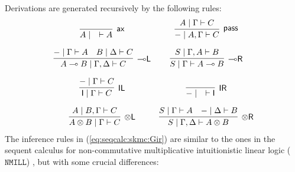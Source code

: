 \documentclass[sn-mathphys-num]{sn-jnl}%
\newcommand{\vd}{\vdash}
\newcommand{\tl}{\otimes \mathsf{L}}
\newcommand{\tr}{\otimes\mathsf{R}}
\newcommand{\pass}{\mathsf{pass}}
\newcommand{\unitl}{\mathsf{IL}}
\newcommand{\unitr}{\mathsf{IR}}
\newcommand{\ax}{\mathsf{ax}}
\newcommand{\ot}{\otimes}
\newcommand{\lolli}{\multimap}
\newcommand{\lleft}{{\lolli}\mathsf{L}}
\newcommand{\lright}{{\lolli}\mathsf{R}}
\newcommand{\unit}{\mathsf{I}}
\newcommand{\NMILL}{$\mathtt{NMILL}$}
\theoremstyle{thmstyleone}%
\theoremstyle{thmstyletwo}%
\theoremstyle{thmstylethree}%
\begin{document}
Derivations are generated recursively by the following rules:
\begin{equation}\label{eq:seqcalc:skmc:Gir}
	  \begin{array}{cc}
		\infer[\ax]{A \mid \quad \vd A}{}
		&
                \infer[\pass]{{-} \mid A , \Gamma \vd C}{A \mid \Gamma \vd C}
                \\[10pt]
		\infer[\lleft]{A \lolli B \mid \Gamma , \Delta \vd C}{
		  {-} \mid \Gamma \vd A
		  &
		  B \mid \Delta \vd C
		}
		&
		\infer[\lright]{S \mid \Gamma \vd A \lolli B}{S \mid \Gamma , A \vd B}
                \\[10pt]
		\infer[\unitl]{\unit \mid \Gamma \vd C}{{-} \mid \Gamma \vd C}
		&
		\infer[\unitr]{{-} \mid \quad \vd \unit}{}
                \\[10pt]
		\infer[\tl]{A \ot B \mid \Gamma \vd C}{A \mid B , \Gamma \vd C}
		&
		\infer[\tr]{S \mid \Gamma , \Delta \vd A \ot B}{
		  S \mid \Gamma \vd A
		  &
		  {-} \mid \Delta \vd B
		}
	  \end{array}
	\end{equation}
The inference rules in (\ref{eq:seqcalc:skmc:Gir}) are similar to the ones in the sequent calculus for non-commutative multiplicative intuitionistic linear logic (\NMILL) \cite{abrusci:noncommutative:1990}, but with some crucial differences: 
\end{document}
